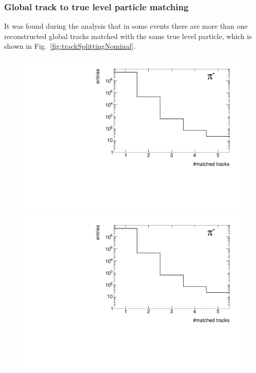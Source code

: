 \subsubsection{Global track to true level particle matching}
It was found during the analysis that in some events there are more than one reconstructed global tracks matched with the same true level particle, which is shown in Fig.~\ref{fig:trackSplittingNominal}. 
\begin{figure}[ht]
	\centering
	\parbox{0.329\textwidth}{
		\centering
		\includegraphics[width=\linewidth,page=1]{graphics/eff/trackSplitting_CD.pdf}\\
		\includegraphics[width=\linewidth,page=4]{graphics/eff/trackSplitting_CD.pdf}\\
	}~
	\parbox{0.329\textwidth}{
		\centering
}
\end{figure}

